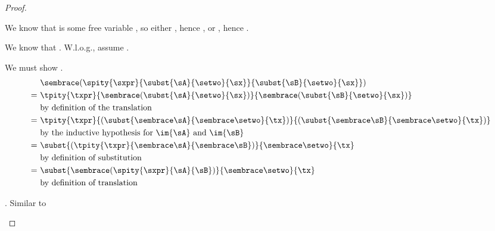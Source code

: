 {\begin{proof}
\begin{proofcases}
    \noindent We know that \im{\seone} is some free variable \im{\sxpr}, so either
    \im{\sxpr = \sx}, hence \im{\cctrans{\setwo} \equiv \cctrans{\setwo}}, or
    \im{\sxpr \neq \sx}, hence \im{\cctrans{\sxpr} \equiv \cctrans{\sxpr}}.

    \item {}

    \noindent We know that \im{\seone = \spity{\sxpr}{\sA}{\sB}}. W.l.o.g., assume \im{\sxpr \neq \sx}.

    We must show
    \im{\cctrans{(\spity{\sxpr}{\subst{\sA}{\setwo}{\sx}}{\subst{\sB}{\setwo}{\sx}})} \equiv
      \subst{\cctrans{(\spity{\sxpr}{\sA}{\sB})}}{\cctrans{\setwo}}{\tx}}.
    \begin{align}
      & \cctrans{(\spity{\sxpr}{\subst{\sA}{\setwo}{\sx}}{\subst{\sB}{\setwo}{\sx}})} \\
      =~& \tpity{\txpr}{\cctrans{(\subst{\sA}{\setwo}{\sx})}}{\cctrans{(\subst{\sB}{\setwo}{\sx})}}
        \\ & \text{by definition of the translation} \nonumber \\
      =~& \tpity{\txpr}{(\subst{\cctrans{\sA}}{\cctrans{\setwo}}{\tx})}{(\subst{\cctrans{\sB}}{\cctrans{\setwo}}{\tx})}
        \\ & \text{by the inductive hypothesis for \im{\sA} and \im{\sB}}
             \nonumber \\
      =~& \subst{(\tpity{\txpr}{\cctrans{\sA}}{\cctrans{\sB}})}{\cctrans{\setwo}}{\tx}
          \\ & \text{by definition of substitution} \nonumber \\
      =~& \subst{\cctrans{(\spity{\sxpr}{\sA}{\sB})}}{\cctrans{\setwo}}{\tx}
          \\ & \text{by definition of translation} \nonumber
    \end{align}

    \item {}. Similar to 

    \item {}


\end{proofcases}
\end{proof}}
